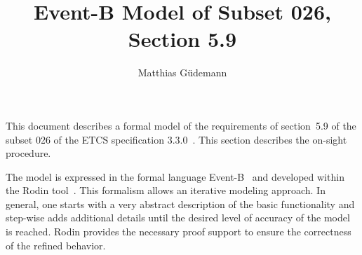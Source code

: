 \documentclass{template/openetcs_article}
\begin{document}
\frontmatter
{}





\newcommand{\true}{\ensuremath{true}}
\newcommand{\btext}[1]{{\it #1}}
\newcommand{\bvar}[1]{\btext{#1}}
\newcommand{\bevent}[1]{\btext{#1}}
\newcommand{\binv}[1]{\btext{#1}}
\newcommand{\bconst}[1]{\btext{#1}}
\newcommand{\bparam}[1]{\btext{#1}}
\newcommand{\bfunc}[1]{\btext{#1}}
\newcommand{\baxiom}[1]{\btext{#1}}
\newcommand{\btype}[1]{\btext{#1}}
\newcommand{\bguard}[1]{\btext{#1}}
\newcommand{\bmachine}[1]{\btext{#1}}
\newcommand{\bctx}[1]{\btext{#1}}

\author{Matthias Güdemann}


\title{Event-B Model of Subset 026, Section 5.9}




\maketitle
\tableofcontents
\listoffiguresandtables
\newpage

This document describes a formal model of the requirements of section~5.9 of
the subset 026 of the ETCS specification 3.3.0~\cite{SRS-026-330}. This section
describes the on-sight procedure.

The model is expressed in the formal language Event-B~\cite{abrial-eventB-Book}
and developed within the Rodin tool~\cite{rodin-handbook}. This formalism allows
an iterative modeling approach. In general, one starts with a very abstract
description of the basic functionality and step-wise adds additional details
until the desired level of accuracy of the model is reached. Rodin provides the
necessary proof support to ensure the correctness of the refined behavior.
\end{document}
